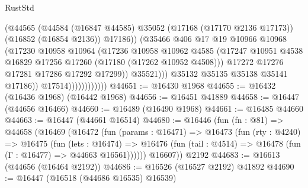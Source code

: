 \begin{lexlean}{RustStd}
\begin{coremodule}
                                    (@44565
                                      (@44584
                                        (@16847 @44585)
                                        @35052
                                        (@17168 (@17170 @2136 @17173))
                                        (@16852 (@16854 @2136))
                                        @17186))
                                    (@35466
                                      @406
                                      @17
                                      @19
                                      @10966
                                      @10968
                                      (@17230
                                        @10958
                                        @10964
                                        (@17236
                                          @10958
                                          @10962
                                          @4585
                                          (@17247
                                            @10951
                                            @4538
                                            @16829
                                            @17256
                                            @17260
                                            (@17180 (@17262 @10952 @4508)))
                                          @17272
                                          @17276
                                          @17281
                                          @17286
                                          @17292
                                          @17299))
                                      @35521)))
                                @35132
                                @35135
                                @35138
                                @35141
                                @17186))
                            @17514))))))))))))
@44651 := @16430 @1968
@44655 := @16432 (@16436 @1968) (@16442 @1968)
@44656 := @16451 @41889
@44658 := @16447 (@44656 @16466)
@44660 := @16489 (@16490 @1968)
@44661 := @16485 @44660
@44663 := @16447 (@44661 @16514)
@44680 := @16446
    (fun (fn : @81) =>
    @44658
      (@16469
        (@16472
          (fun (params : @16471) =>
          @16473
            (fun (rty : @4240) =>
            @16475
              (fun (lets : @16474) =>
              @16476 (fun (tail : @4514) => @16478 (fun (Γ : @16477) => @44663 @16561))))))
        @16607))
    @2192
@44683 := @16613 (@44656 (@16464 @2192))
@44686 := @16526 (@16527 @2192) @41892
@44690 := @16447 (@16518 (@44686 @16535) @16539)

\end{coremodule}
\end{lexlean}
